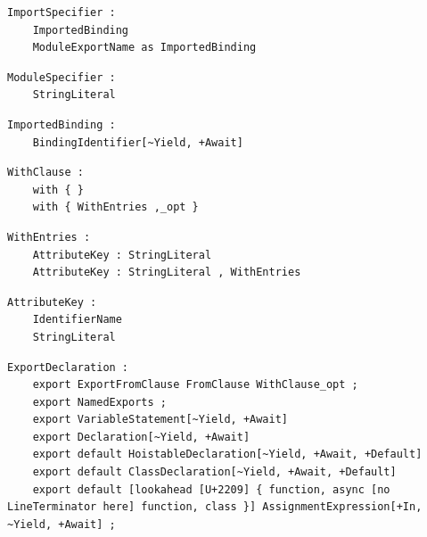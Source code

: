 \noindent\textbf{\texttt{}}\par
\begin{lstlisting}
ImportSpecifier :
    ImportedBinding
    ModuleExportName as ImportedBinding
\end{lstlisting}

\noindent\textbf{\texttt{}}\par
\begin{lstlisting}
ModuleSpecifier :
    StringLiteral
\end{lstlisting}

\noindent\textbf{\texttt{}}\par
\begin{lstlisting}
ImportedBinding :
    BindingIdentifier[~Yield, +Await]
\end{lstlisting}

\noindent\textbf{\texttt{}}\par
\begin{lstlisting}
WithClause :
    with { }
    with { WithEntries ,_opt }
\end{lstlisting}

\noindent\textbf{\texttt{}}\par
\begin{lstlisting}
WithEntries :
    AttributeKey : StringLiteral
    AttributeKey : StringLiteral , WithEntries
\end{lstlisting}

\noindent\textbf{\texttt{}}\par
\begin{lstlisting}
AttributeKey :
    IdentifierName
    StringLiteral
\end{lstlisting}

\noindent\textbf{\texttt{}}\par
\begin{lstlisting}
ExportDeclaration :
    export ExportFromClause FromClause WithClause_opt ;
    export NamedExports ;
    export VariableStatement[~Yield, +Await]
    export Declaration[~Yield, +Await]
    export default HoistableDeclaration[~Yield, +Await, +Default]
    export default ClassDeclaration[~Yield, +Await, +Default]
    export default [lookahead [U+2209] { function, async [no LineTerminator here] function, class }] AssignmentExpression[+In, ~Yield, +Await] ;
\end{lstlisting}

